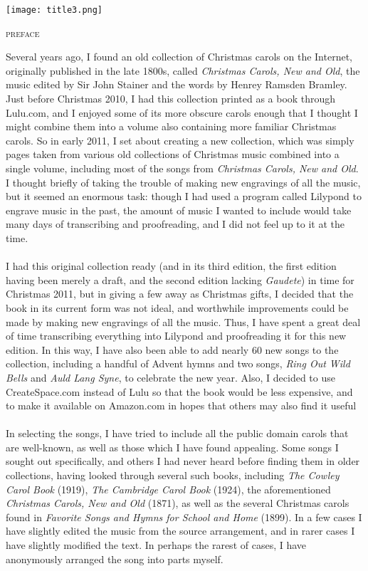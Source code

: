 \documentclass[letterpaper,12pt]{book} %
\begin{document}
\pagebreak
\vspace*{0pt}
\vfill
\noindent
\texttt{[image: title3.png]}%
\vfill
\pagebreak
\begin{center}
\fontsize{19}{19}\selectfont
\textsc{preface}
\end{center}
Several years ago, I found an old collection of Christmas carols on the Internet, originally published in the late 1800s, called \emph{Christmas Carols, New and Old}, the music edited by Sir John Stainer and the words by Henrey Ramsden Bramley.  Just before Christmas 2010, I had this collection printed as a book through Lulu.com, and I enjoyed some of its more obscure carols enough that I thought I might combine them into a volume also containing more familiar Christmas carols.  So in early 2011, I set about creating a new collection, which was simply pages taken from various old collections of Christmas music combined into a single volume, including most of the songs from \emph{Christmas Carols, New and Old}.  I thought briefly of taking the trouble of making new engravings of all the music, but it seemed an enormous task: though I had used a program called Lilypond to engrave music in the past, the amount of music I wanted to include would take many days of transcribing and proofreading, and I did not feel up to it at the time.\\
\\
\vfill
I had this original collection ready (and in its third edition, the first edition having been merely a draft, and the second edition lacking \emph{Gaudete}) in time for Christmas 2011, but in giving a few away as Christmas gifts, I decided that the book in its current form was not ideal, and worthwhile improvements could be made by making new engravings of all the music.  Thus, I have spent a great deal of time transcribing everything into Lilypond and proofreading it for this new edition.  In this way, I have also been able to add nearly 60 new songs to the collection, including a handful of Advent hymns and two songs, \emph{Ring Out Wild Bells} and \emph{Auld Lang Syne}, to celebrate the new year.  Also, I decided to use CreateSpace.com instead of Lulu so that the book would be less expensive, and to make it available on Amazon.com in hopes that others may also find it useful\\
\\
\vfill
In selecting the songs, I have tried to include all the public domain carols that are well-known, as well as those which I have found appealing.  Some songs I sought out specifically, and others I had never heard before finding them in older collections, having looked through several such books, including \emph{The Cowley Carol Book} (1919), \emph{The Cambridge Carol Book} (1924), the aforementioned \emph{Christmas Carols, New and Old} (1871), as well as the several Christmas carols found in \emph{Favorite Songs and Hymns for School and Home} (1899).  In a few cases I have slightly edited the music from the source arrangement, and in rarer cases I have slightly modified the text.  In perhaps the rarest of cases, I have anonymously arranged the song into parts myself.\\
\end{document}
